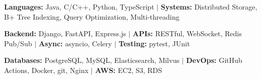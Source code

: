 %
\item\small{\textbf{Languages:} Java, C/C++, Python, TypeScript $|$ \textbf{Systems:} Distributed Storage, B+ Tree Indexing, Query Optimization, Multi-threading}
\item\small{\textbf{Backend:} Django, FastAPI, Express.js $|$ \textbf{APIs:} RESTful, WebSocket, Redis Pub/Sub $|$ \textbf{Async:} asyncio, Celery $|$ \textbf{Testing:} pytest, JUnit}
\item\small{\textbf{Databases:} PostgreSQL, MySQL, Elasticsearch, Milvus $|$ \textbf{DevOps:} GitHub Actions, Docker, git, Nginx $|$ \textbf{AWS:} EC2, S3, RDS}%
